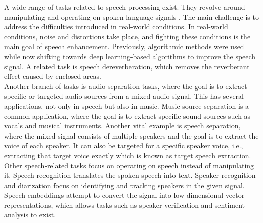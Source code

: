A wide range of tasks related to speech processing exist. They revolve around manipulating and operating on spoken language signals \cite{mehrish2023}. The main challenge is to address the difficulties introduced in real-world conditions. In real-world conditions, noise and distortions take place, and fighting these conditions is the main goal of speech enhancement. Previously, algorithmic methods were used while now shifting towards deep learning-based algorithms to improve the speech signal. A related task is speech dereverberation, which removes the reverberant effect caused by enclosed areas.\\
Another branch of tasks is audio separation tasks, where the goal is to extract specific or targeted audio sources from a mixed audio signal. This has several applications, not only in speech but also in music. Music source separation is a common application, where the goal is to extract specific sound sources such as vocals and musical instruments. Another vital example is speech separation, where the mixed signal consists of multiple speakers and the goal is to extract the voice of each speaker. It can also be targeted for a specific speaker voice, i.e., extracting that target voice exactly which is known as target speech extraction.\\
Other speech-related tasks focus on operating on speech instead of manipulating it. Speech recognition translates the spoken speech into text. Speaker recognition and diarization focus on identifying and tracking speakers in the given signal. Speech embeddings attempt to convert the signal into low-dimensional vector representations, which allows tasks such as speaker verification and sentiment analysis to exist.

